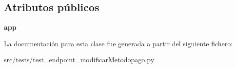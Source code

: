 \subsection*{Atributos públicos}
\begin{DoxyCompactItemize}
\item 
\hypertarget{classsrc_1_1tests_1_1test__endpoint__modificar_metodopago_1_1_test_endpoint_modificar_metodopago_a981f2dc36af9b2c741195afde0bb5558}{{\bfseries app}}\label{classsrc_1_1tests_1_1test__endpoint__modificar_metodopago_1_1_test_endpoint_modificar_metodopago_a981f2dc36af9b2c741195afde0bb5558}

\end{DoxyCompactItemize}


La documentación para esta clase fue generada a partir del siguiente fichero\-:\begin{DoxyCompactItemize}
\item 
src/tests/test\-\_\-endpoint\-\_\-modificar\-Metodopago.\-py\end{DoxyCompactItemize}
